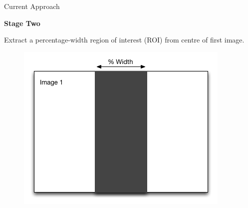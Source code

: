 \documentclass[10pt, compress]{beamer}
\begin{document}
\begin{frame}{Current Approach}

\textbf{Stage Two} \\ \vspace{0.2cm}

Extract a percentage-width region of interest (ROI) from centre of first image.

\begin{figure}[ht!]
\centering
\includegraphics[scale=0.5]{stage1.png}
  \end{figure}
  
\end{frame}
\end{document}
